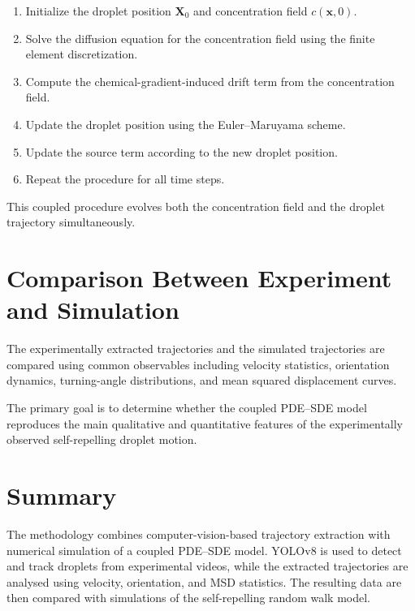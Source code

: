 \begin{enumerate}
    \item Initialize the droplet position \(\mathbf{X}_0\) and concentration field \(c(\mathbf{x},0)\).
    
    \item Solve the diffusion equation for the concentration field using the finite element discretization.
    
    \item Compute the chemical-gradient-induced drift term from the concentration field.
    
    \item Update the droplet position using the Euler--Maruyama scheme.
    
    \item Update the source term according to the new droplet position.
    
    \item Repeat the procedure for all time steps.
\end{enumerate}

This coupled procedure evolves both the concentration field and the droplet trajectory simultaneously.

\section{Comparison Between Experiment and Simulation}

The experimentally extracted trajectories and the simulated trajectories are compared using common observables including velocity statistics, orientation dynamics, turning-angle distributions, and mean squared displacement curves.

The primary goal is to determine whether the coupled PDE--SDE model reproduces the main qualitative and quantitative features of the experimentally observed self-repelling droplet motion.

\section{Summary}

The methodology combines computer-vision-based trajectory extraction with numerical simulation of a coupled PDE--SDE model. YOLOv8 is used to detect and track droplets from experimental videos, while the extracted trajectories are analysed using velocity, orientation, and MSD statistics. The resulting data are then compared with simulations of the self-repelling random walk model.
